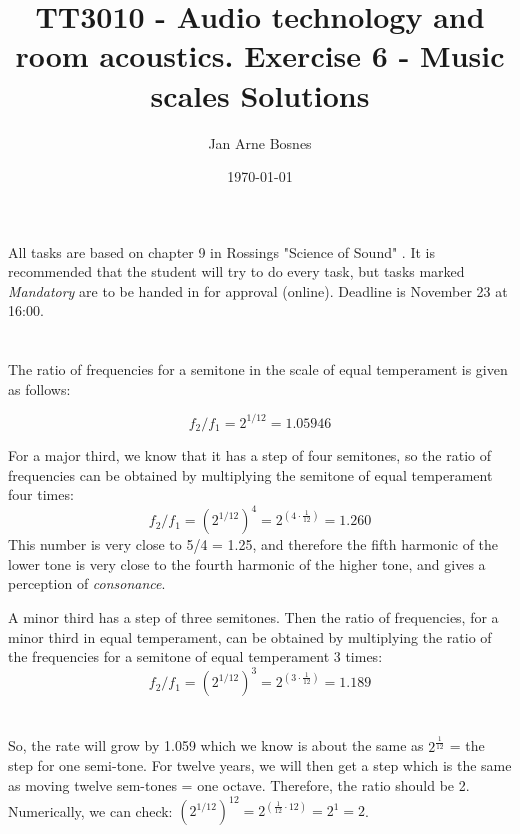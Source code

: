 \documentclass{article}
\title{TT3010 - Audio technology and room acoustics. \newline Exercise 6 - Music scales \newline Solutions}
\author{Jan Arne Bosnes}
\date{\today}
\begin{document}
\maketitle

All tasks are based on chapter 9 in Rossings "Science of Sound" \cite{rossing}. 
It is recommended that the student will try to do every task, but tasks marked \textit{Mandatory} are to be handed in for approval (online). Deadline is November 23 at 16:00.

\section{}

The ratio of frequencies for a semitone in the scale of equal temperament is given as follows:

\begin{equation}
    f_2/f_1 = 2^{1/12} = 1.05946
\end{equation}

For a major third, we know that it has a step of four semitones, so the ratio of frequencies can be obtained by multiplying the semitone of equal temperament four times:
\begin{equation}
    f_2/f_1 = \left( 2^{1/12} \right)^4 =2^{(4\cdot \frac{1}{12})}= 1.260
\end{equation}
This number is very close to 5/4 = 1.25, and therefore the fifth harmonic of the lower tone is very close to the fourth harmonic of the higher tone, and gives a perception of {\em consonance}.

A minor third has a step of three semitones. Then the ratio of frequencies, for a minor third in equal temperament, can be obtained by multiplying the ratio of the frequencies for a semitone of equal temperament 3 times:
\begin{equation}
    f_2/f_1 = \left( 2^{1/12} \right)^3 = 2^{(3 \cdot \frac{1}{12})} = 1.189
\end{equation}
%
\section{}

So, the rate will grow by 1.059 which we know is about the same as $2^{\frac{1}{12}}$ = the step for one semi-tone. For twelve years, we will then get a step which is the same as moving twelve sem-tones = one octave. Therefore, the ratio should be 2. Numerically, we can check: $\left( 2^{1/12} \right)^{12} = 2^{\left(\frac{1}{12}\cdot 12\right)} = 2^1=2$.
\end{document}

